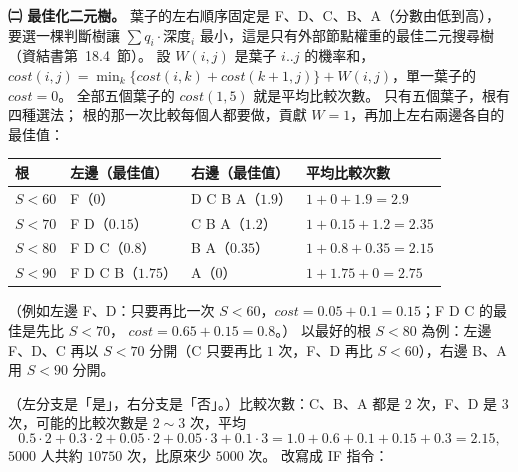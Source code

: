 \begin{pastsoln}
\textbf{㈡ 最佳化二元樹。} 葉子的左右順序固定是 F、D、C、B、A（分數由低到高），要選一棵判斷樹讓
$\sum q_i \cdot \text{深度}_i$ 最小，這是只有外部節點權重的最佳二元搜尋樹（資結書第~18.4~節）。 設 $W(i,j)$ 是葉子 $i..j$
的機率和，$\mathit{cost}(i,j) = \min_k \{\mathit{cost}(i,k) + \mathit{cost}(k+1,j)\} + W(i,j)$，單一葉子的 $\mathit{cost} = 0$。
全部五個葉子的 $\mathit{cost}(1,5)$ 就是平均比較次數。 只有五個葉子，根有四種選法；
根的那一次比較每個人都要做，貢獻 $W = 1$，再加上左右兩邊各自的最佳值：
\begin{center}
\begin{tabular}{llll}
\toprule
根 & 左邊（最佳值） & 右邊（最佳值） & 平均比較次數 \\
\midrule
$S < 60$ & F（$0$） & D C B A（$1.9$） & $1 + 0 + 1.9 = 2.9$ \\
$S < 70$ & F D（$0.15$） & C B A（$1.2$） & $1 + 0.15 + 1.2 = 2.35$ \\
$S < 80$ & F D C（$0.8$） & B A（$0.35$） & $1 + 0.8 + 0.35 = \mathbf{2.15}$ \\
$S < 90$ & F D C B（$1.75$） & A（$0$） & $1 + 1.75 + 0 = 2.75$ \\
\bottomrule
\end{tabular}
\end{center}
（例如左邊 F、D：只要再比一次 $S < 60$，$\mathit{cost} = 0.05 + 0.1 = 0.15$；F D C 的最佳是先比 $S < 70$，
$\mathit{cost} = 0.65 + 0.15 = 0.8$。）
以最好的根 $S < 80$ 為例：左邊 F、D、C 再以 $S < 70$ 分開（C 只要再比 $1$ 次，F、D 再比 $S < 60$），右邊 B、A 用
$S < 90$ 分開。
\begin{center}
\end{center}
（左分支是「是」，右分支是「否」。）比較次數：C、B、A 都是 $2$ 次，F、D 是 $3$ 次，可能的比較次數是 $2 \sim 3$ 次，平均
\[
0.5 \cdot 2 + 0.3 \cdot 2 + 0.05 \cdot 2 + 0.05 \cdot 3 + 0.1 \cdot 3 = 1.0 + 0.6 + 0.1 + 0.15 + 0.3 = 2.15,
\]
$5000$ 人共約 $10750$ 次，比原來少 $5000$ 次。 改寫成 IF 指令：

\end{pastsoln}

